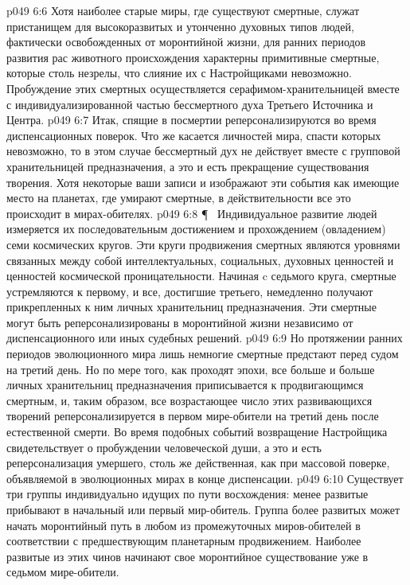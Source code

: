 \vs p049 6:6 Хотя наиболее старые миры, где существуют смертные, служат пристанищем для высокоразвитых и утонченно духовных типов людей, фактически освобожденных от моронтийной жизни, для ранних периодов развития рас животного происхождения характерны примитивные смертные, которые столь незрелы, что слияние их с Настройщиками невозможно. Пробуждение этих смертных осуществляется серафимом\hyp{}хранительницей вместе с индивидуализированной частью бессмертного духа Третьего Источника и Центра.
\vs p049 6:7 Итак, спящие в посмертии реперсонализируются во время диспенсационных поверок. Что же касается личностей мира, спасти которых невозможно, то в этом случае бессмертный дух не действует вместе с групповой хранительницей предназначения, а это и есть прекращение существования творения. Хотя некоторые ваши записи и изображают эти события как имеющие место на планетах, где умирают смертные, в действительности все это происходит в мирах\hyp{}обителях.
\vs p049 6:8 \P\ \bibnobreakspace {} Индивидуальное развитие людей измеряется их последовательным достижением и прохождением (овладением) семи космических кругов. Эти круги продвижения смертных являются уровнями связанных между собой интеллектуальных, социальных, духовных ценностей и ценностей космической проницательности. Начиная c седьмого круга, смертные устремляются к первому, и все, достигшие третьего, немедленно получают прикрепленных к ним личных хранительниц предназначения. Эти смертные могут быть реперсонализированы в моронтийной жизни независимо от диспенсационного или иных судебных решений.
\vs p049 6:9 Но протяжении ранних периодов эволюционного мира лишь немногие смертные предстают перед судом на третий день. Но по мере того, как проходят эпохи, все больше и больше личных хранительниц предназначения приписывается к продвигающимся смертным, и, таким образом, все возрастающее число этих развивающихся творений реперсонализируется в первом мире\hyp{}обители на третий день после естественной смерти. Во время подобных событий возвращение Настройщика свидетельствует о пробуждении человеческой души, а это и есть реперсонализация умершего, столь же действенная, как при массовой поверке, объявляемой в эволюционных мирах в конце диспенсации.
\vs p049 6:10 Существует три группы индивидуально идущих по пути восхождения: менее развитые прибывают в начальный или первый мир\hyp{}обитель. Группа более развитых может начать моронтийный путь в любом из промежуточных миров\hyp{}обителей в соответствии с предшествующим планетарным продвижением. Наиболее развитые из этих чинов начинают свое моронтийное существование уже в седьмом мире\hyp{}обители.
